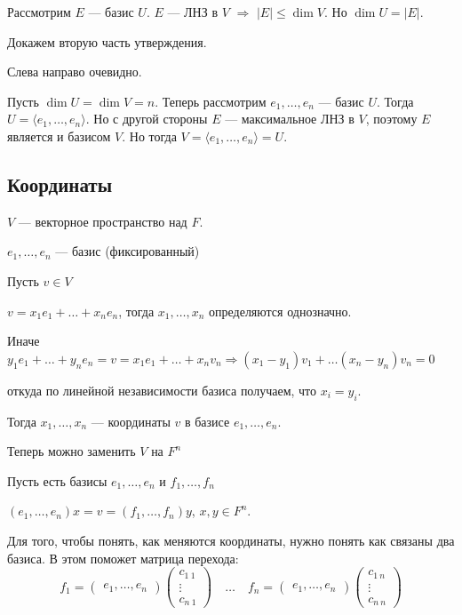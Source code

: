 Рассмотрим \( E \) --- базис \( U \).
\( E \) --- ЛНЗ в \( V \) \( \Rightarrow \) \( |E| \leq \dim V \).
Но \( \dim U = |E| \).

Докажем вторую часть утверждения.

Слева направо очевидно.

Пусть \( \dim U = \dim V = n \).
Теперь рассмотрим \( e_1, \ldots, e_n \) --- базис \( U \).
Тогда \( U = \langle e_1, \ldots, e_n \rangle \).
Но с другой стороны \( E \) --- максимальное ЛНЗ в \( V \), поэтому \( E \) является и базисом \( V \).
Но тогда \( V = \langle e_1, \ldots, e_n \rangle = U \).

\newpage

\subsection{Координаты}

\( V \) --- векторное пространство над \( F \).

\( e_1, \ldots, e_n \) --- базис (фиксированный)

Пусть \( v \in V \)

\( v = x_1 e_1 + \ldots + x_n e_n \), тогда \( x_1, \ldots, x_n \) определяются однозначно.

Иначе
\(
    y_1 e_1 + \ldots + y_n e_n = v = x_1 e_1 + \ldots + x_n v_n \Rightarrow (x_1 - y_1) v_1 + \ldots (x_n - y_n) v_n = 0
\)

откуда по линейной независимости базиса получаем, что \( x_i = y_i \).

Тогда \( x_1, \ldots, x_n \) --- координаты \( v \) в базисе \( e_1, \ldots, e_n \).

Теперь можно заменить \( V \) на \( F^n \)

Пусть есть базисы \( e_1, \ldots, e_n \) и \( f_1, \ldots, f_n \)

\( (e_1, \ldots, e_n) x = v = (f_1, \ldots, f_n) y \), \( x, y \in F^n \).

Для того, чтобы понять, как меняются координаты, нужно понять как связаны два базиса.
В этом поможет матрица перехода:
\[
    f_1
    =
    \begin{pmatrix}
        e_1, \ldots, e_n
    \end{pmatrix}
    \begin{pmatrix}
        c_{1 \: 1}
        \\
        \vdots
        \\
        c_{n \: 1}
    \end{pmatrix}
    \quad \ldots \quad
    f_n
    =
    \begin{pmatrix}
        e_1, \ldots, e_n
    \end{pmatrix}
    \begin{pmatrix}
        c_{1 \: n}
        \\
        \vdots
        \\
        c_{n \: n}
    \end{pmatrix}
\]

